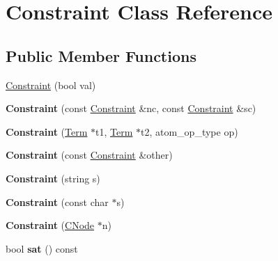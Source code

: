 \hypertarget{classConstraint}{\section{\-Constraint \-Class \-Reference}
\label{classConstraint}
}
\subsection*{\-Public \-Member \-Functions}
\begin{DoxyCompactItemize}
\item 
\hyperlink{classConstraint_ae71d72d276e9659fabfc46fef811a028}{\-Constraint} (bool val)
\item 
\hypertarget{classConstraint_a00c534e4259ed3d1170bd4a4be0c791d}{{\bfseries \-Constraint} (const \hyperlink{classConstraint}{\-Constraint} \&nc, const \hyperlink{classConstraint}{\-Constraint} \&sc)}\label{classConstraint_a00c534e4259ed3d1170bd4a4be0c791d}

\item 
\hypertarget{classConstraint_a8a9db03093f7d3a866372091fbdb8ad1}{{\bfseries \-Constraint} (\hyperlink{classTerm}{\-Term} $\ast$t1, \hyperlink{classTerm}{\-Term} $\ast$t2, atom\-\_\-op\-\_\-type op)}\label{classConstraint_a8a9db03093f7d3a866372091fbdb8ad1}

\item 
\hypertarget{classConstraint_a425fef97454f148d33336ad5d2702efb}{{\bfseries \-Constraint} (const \hyperlink{classConstraint}{\-Constraint} \&other)}\label{classConstraint_a425fef97454f148d33336ad5d2702efb}

\item 
\hypertarget{classConstraint_a018537160b44de93f4cec08a5b98e566}{{\bfseries \-Constraint} (string s)}\label{classConstraint_a018537160b44de93f4cec08a5b98e566}

\item 
\hypertarget{classConstraint_a53f3ff0a5b48bc1d2ce09eff2bbeafd7}{{\bfseries \-Constraint} (const char $\ast$s)}\label{classConstraint_a53f3ff0a5b48bc1d2ce09eff2bbeafd7}

\item 
\hypertarget{classConstraint_a2add92afbe6070600d03e227c9707202}{{\bfseries \-Constraint} (\hyperlink{classCNode}{\-C\-Node} $\ast$n)}\label{classConstraint_a2add92afbe6070600d03e227c9707202}

\item 
\hypertarget{classConstraint_a11dec508c3495c846204417274363ea7}{bool {\bfseries sat} () const }\label{classConstraint_a11dec508c3495c846204417274363ea7}


\end{DoxyCompactItemize}
